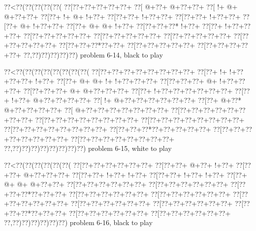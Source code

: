 \vbox{\vbox{\goo
\0??<\0??(\0??(\0??(\0??(\0??(
\0??[\0??+\0??+\0??+\0??+\0??+
\0??[\- @+\0??+\- @+\0??+\0??+
\0??[\- !+\- @+\- @+\0??+\0??+
\0??[\0??+\- !+\- @+\- !+\0??+
\0??[\0??+\0??+\- !+\0??+\0??+
\0??[\0??+\0??+\- !+\0??+\0??+
\0??[\0??+\- @+\- !+\0??+\0??+
\0??[\0??+\- @+\- @+\- !+\0??+
\0??[\0??+\0??+\0??*\- !+\0??+
\0??[\0??+\- !+\0??+\0??+\0??+
\0??[\0??+\0??+\0??+\0??+\0??+
\0??[\0??+\0??+\0??+\0??+\0??+
\0??[\0??+\0??+\0??+\0??+\0??+
\0??[\0??+\0??+\0??+\0??+\0??+
\0??[\0??+\0??+\0??*\0??+\0??+
\0??[\0??+\0??+\0??+\0??+\0??+
\0??[\0??+\0??+\0??+\0??+\0??+
\0??,\0??)\0??)\0??)\0??)\0??)
}
\hfil problem 6-14, black to play\hfil\break
}

\vbox{\vbox{\goo
\0??<\0??(\0??(\0??(\0??(\0??(\0??(\0??(\0??(
\0??[\0??+\0??+\0??+\0??+\0??+\0??+\0??+\0??+
\0??[\0??+\- !+\- !+\0??+\0??+\0??+\- !+\0??+
\0??[\0??+\- @+\- @+\- !+\- !+\0??+\0??+\0??+
\0??[\0??+\0??+\0??+\- @+\- !+\0??+\0??+\0??+
\0??[\0??+\0??+\0??+\- @+\- @+\0??+\0??+\0??+
\0??[\0??+\- !+\0??+\0??+\0??+\0??+\0??+\0??+
\0??[\0??+\- !+\0??+\- @+\0??+\0??+\0??+\0??+
\0??[\- !+\- @+\0??+\0??+\0??+\0??+\0??+\0??+
\0??[\0??+\- @+\0??*\- @+\0??+\0??+\0??+\0??+
\0??[\- @+\0??+\0??+\0??+\0??+\0??+\0??+\0??+
\0??[\0??+\0??+\0??+\0??+\0??+\0??+\0??+\0??+
\0??[\0??+\0??+\0??+\0??+\0??+\0??+\0??+\0??+
\0??[\0??+\0??+\0??+\0??+\0??+\0??+\0??+\0??+
\0??[\0??+\0??+\0??+\0??+\0??+\0??+\0??+\0??+
\0??[\0??+\0??+\0??*\0??+\0??+\0??+\0??+\0??+
\0??[\0??+\0??+\0??+\0??+\0??+\0??+\0??+\0??+
\0??[\0??+\0??+\0??+\0??+\0??+\0??+\0??+\0??+
\0??,\0??)\0??)\0??)\0??)\0??)\0??)\0??)\0??)
}
\hfil problem 6-15, white to play\hfil\break
}

\vbox{\vbox{\goo
\0??<\0??(\0??(\0??(\0??(\0??(\0??(
\0??[\0??+\0??+\0??+\0??+\0??+\0??+
\0??[\0??+\0??+\- @+\0??+\- !+\0??+
\0??[\0??+\0??+\- @+\0??+\0??+\0??+
\0??[\0??+\0??+\- !+\0??+\- !+\0??+
\0??[\0??+\0??+\- !+\0??+\- !+\0??+
\0??[\0??+\- @+\- @+\- @+\0??+\0??+
\0??[\0??+\0??+\0??+\0??+\0??+\0??+
\0??[\0??+\0??+\0??+\0??+\0??+\0??+
\0??[\0??+\0??+\0??*\0??+\0??+\0??+
\0??[\0??+\0??+\0??+\0??+\0??+\0??+
\0??[\0??+\0??+\0??+\0??+\0??+\0??+
\0??[\0??+\0??+\0??+\0??+\0??+\0??+
\0??[\0??+\0??+\0??+\0??+\0??+\0??+
\0??[\0??+\0??+\0??+\0??+\0??+\0??+
\0??[\0??+\0??+\0??*\0??+\0??+\0??+
\0??[\0??+\0??+\0??+\0??+\0??+\0??+
\0??[\0??+\0??+\0??+\0??+\0??+\0??+
\0??,\0??)\0??)\0??)\0??)\0??)\0??)
}
\hfil problem 6-16, black to play\hfil\break
}

